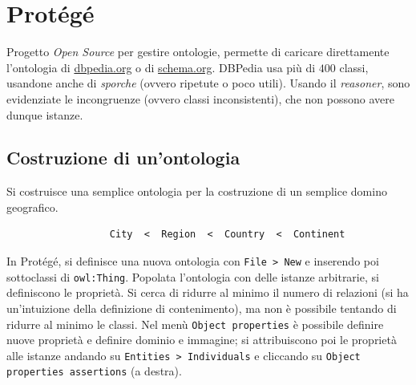 \documentclass[11pt]{article}
\begin{document}
\section{Protégé}
Progetto \textit{Open Source} per gestire ontologie, permette di caricare direttamente l'ontologia di \url{dbpedia.org} o di \url{schema.org}.
DBPedia usa più di $400$ classi, usandone anche di \textit{sporche} (ovvero ripetute o poco utili).
Usando il \textit{reasoner}, sono evidenziate le incongruenze (ovvero classi inconsistenti), che non possono avere dunque istanze.

\subsection*{Costruzione di un'ontologia}
Si costruisce una semplice ontologia per la costruzione di un semplice domino geografico.
\begin{verbatim}
                  City  <  Region  <  Country  <  Continent
\end{verbatim}
In Protégé, si definisce una nuova ontologia con \verb|File > New| e inserendo poi sottoclassi di \verb|owl:Thing|.
Popolata l'ontologia con delle istanze arbitrarie, si definiscono le proprietà.
Si cerca di ridurre al minimo il numero di relazioni (si ha un'intuizione della definizione di contenimento), ma non è possibile tentando di ridurre al minimo le classi.
Nel menù \verb|Object properties| è possibile definire nuove proprietà e definire dominio e immagine; si attribuiscono poi le proprietà alle istanze andando su \verb|Entities > Individuals| e cliccando su \verb|Object properties assertions| (a destra).
\end{document}
